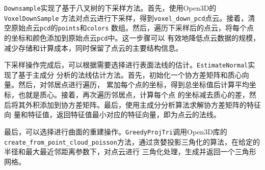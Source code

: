 \par \texttt{Downsample}实现了基于八叉树的下采样方法。首先，使用Open3D的\texttt{VoxelDownSample}
方法对点云进行下采样，得到\texttt{voxel\_down\_pcd}点云。接着，清空原始点云\texttt{pcd}的\texttt{points}和\texttt{colors}
数组。然后，遍历下采样后的点云，将每个点的坐标和颜色添加到原始点云\texttt{pcd}中。这一步骤可以
有效地降低点云数据的规模，减少存储和计算成本，同时保留了点云的主要结构信息。





\par 下采样操作完成后，可以根据需要选择进行表面法线的估计。\texttt{EstimateNormal}实现了基于主成分
分析的法线估计方法。首先，初始化一个协方差矩阵和质心向量。然后，对邻居点进行遍历，
累加每个点的坐标，得到总坐标值后计算平均坐标，也就是质心。接着，再次遍历邻居点，计算每个点
的坐标减去质心的差，然后将其外积添加到协方差矩阵。最后，使用主成分分析算法求解协方差矩阵的特征向
量和特征值，返回特征值最小对应的特征向量，即为点云的法线。

\par 最后，可以选择进行曲面的重建操作。\texttt{GreedyProjTri}调用Open3D库的
\texttt{create\_from\_point\_cloud\_poisson}方法，通过贪婪投影三角化的算法，在给定的半径和最大最近邻距离参数下，对点云进行
三角化处理，生成并返回一个三角形网格。
